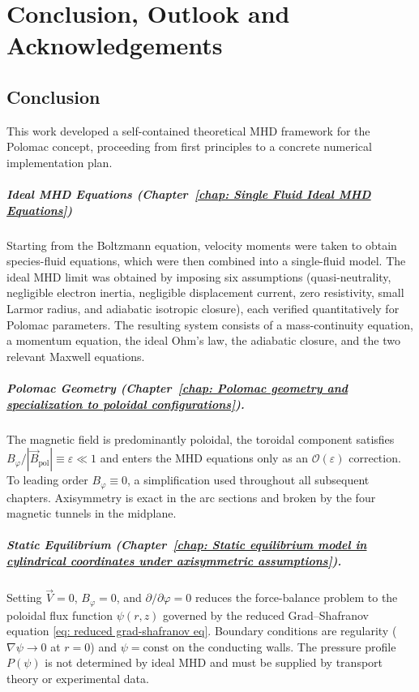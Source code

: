 \chapter{Conclusion, Outlook and Acknowledgements}
\label{chap: Conclusion and Outlook}

\section{Conclusion}
\label{sec: conclusion}

This work developed a self-contained theoretical MHD framework for the Polomac concept,
proceeding from first principles to a concrete numerical implementation plan.

\paragraph{Ideal MHD Equations (Chapter~\ref{chap: Single Fluid Ideal MHD Equations})}
Starting from the Boltzmann equation, velocity moments were taken to obtain species-fluid
equations, which were then combined into a single-fluid model.
The ideal MHD limit was obtained by imposing six assumptions (quasi-neutrality, negligible
electron inertia, negligible displacement current, zero resistivity, small Larmor radius,
and adiabatic isotropic closure), each verified quantitatively for Polomac parameters.
The resulting system consists of a mass-continuity equation, a momentum equation, the
ideal Ohm's law, the adiabatic closure, and the two relevant Maxwell equations.

\paragraph{Polomac Geometry (Chapter~\ref{chap: Polomac geometry and specialization to poloidal configurations}).}
The magnetic field is predominantly poloidal, the toroidal component satisfies
$B_\varphi/|\vec{B}_\mathrm{pol}|\equiv\varepsilon\ll 1$ and enters the MHD equations
only as an $\mathcal{O}(\varepsilon)$ correction.
To leading order $B_\varphi\equiv 0$, a simplification used throughout all subsequent
chapters.
Axisymmetry is exact in the arc sections and broken by the four magnetic tunnels
in the midplane.

\paragraph{Static Equilibrium (Chapter~\ref{chap: Static equilibrium model in cylindrical coordinates under axisymmetric assumptions}).}
Setting $\vec{V}=0$, $B_\varphi=0$, and $\partial/\partial\varphi=0$ reduces the
force-balance problem to the poloidal flux function $\psi(r,z)$ governed by the
reduced Grad–Shafranov equation \eqref{eq: reduced grad-shafranov eq}.
Boundary conditions are regularity ($\nabla\psi\to 0$ at $r=0$) and
$\psi=\mathrm{const}$ on the conducting walls.
The pressure profile $P(\psi)$ is not determined by ideal MHD and must be supplied by
transport theory or experimental data.

